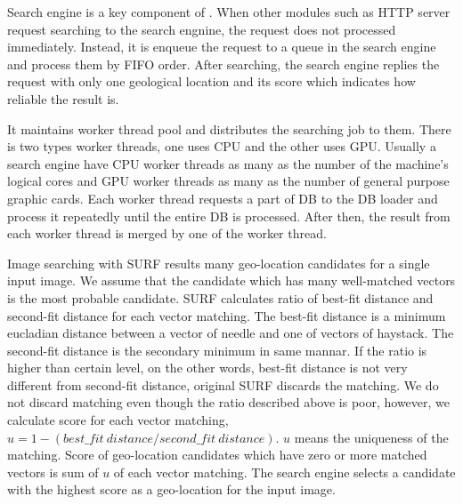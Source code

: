 
Search engine is a key component of \name{}.
When other modules such as HTTP server request searching to the search engnine, the request does not processed immediately.
Instead, it is enqueue the request to a queue in the search engine and process them by FIFO order.
After searching, the search engine replies the request with only one geological location and its score which indicates how reliable the result is.

It maintains worker thread pool and distributes the searching job to them.
There is two types worker threads, one uses CPU and the other uses GPU.
Usually a search engine have CPU worker threads as many as the number of the machine's logical cores and GPU worker threads as many as the number of general purpose graphic cards.
Each worker thread requests a part of DB to the DB loader and process it repeatedly until the entire DB is processed.
After then, the result from each worker thread is merged by one of the worker thread.

Image searching with SURF results many geo-location candidates for a single input image.
We assume that the candidate which has many well-matched vectors is the most probable candidate.
SURF calculates ratio of best-fit distance and second-fit distance for each vector matching.
The best-fit distance is a minimum eucladian distance between a vector of needle and one of vectors of haystack.
The second-fit distance is the secondary minimum in same mannar.
If the ratio is higher than certain level, on the other words, best-fit distance is not very different from second-fit distance, original SURF discards the matching.
We do not discard matching even though the ratio described above is poor, however, we calculate score for each vector matching,
$u = 1 - (best\_fit\ distance / second\_fit\ distance)$.
$u$ means the uniqueness of the matching.
Score of geo-location candidates which have zero or more matched vectors is sum of $u$ of each vector matching.
The search engine selects a candidate with the highest score as a geo-location for the input image.


